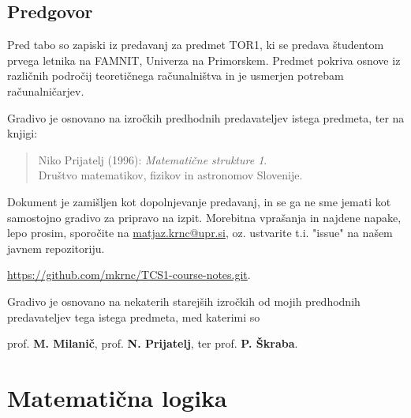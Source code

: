 \documentclass[11pt,paper=b5,footinclude,headinclude]{scrbook} %
\begin{document}



\newpage
\section*{Predgovor}
Pred tabo so zapiski iz predavanj za predmet TOR1, ki se predava študentom prvega letnika na FAMNIT, Univerza na Primorskem.
Predmet pokriva osnove iz različnih področij teoretičnega računalništva in je usmerjen potrebam računalničarjev.

Gradivo je osnovano na izročkih  predhodnih predavateljev istega predmeta, ter na knjigi: 
\begin{quote}
   Niko Prijatelj (1996):
   \emph{Matematične strukture 1}.
   \\
   Društvo   matematikov,   fizikov in astronomov Slovenije. 
\end{quote}

Dokument je zamišljen kot dopolnjevanje predavanj, in se ga ne sme jemati kot samostojno gradivo za pripravo na izpit. 
Morebitna vprašanja in najdene napake, lepo prosim, sporočite na
\url{matjaz.krnc@upr.si}, oz. ustvarite t.i. "issue"\xspace na našem javnem repozitoriju.
\begin{center}
    \url{https://github.com/mkrnc/TCS1-course-notes.git}.    
\end{center}

\medskip
Gradivo je osnovano na nekaterih starejših izročkih od mojih predhodnih predavateljev tega istega predmeta, med katerimi so 
\begin{center}
    prof. \textbf{M. Milanič}, 
    prof. \textbf{N. Prijatelj}, ter 
    prof. \textbf{P. Škraba}.
\end{center}




\tableofcontents


\chapter{Matematična logika}
\end{document}
